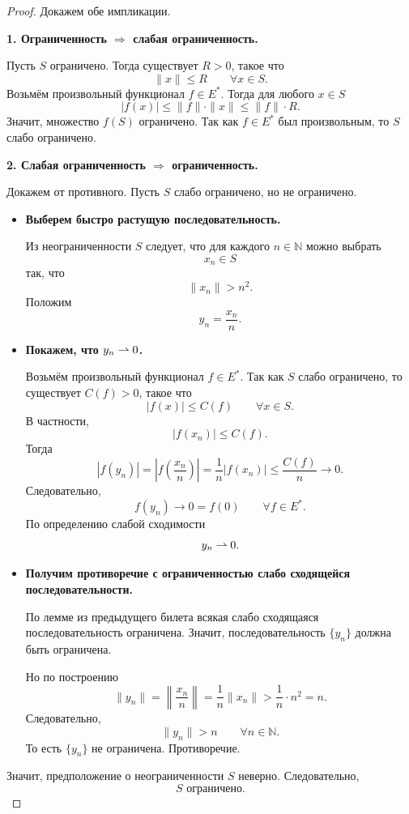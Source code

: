 \begin{proof}
	Докажем обе импликации.
	
	\textbf{1. Ограниченность \(\Rightarrow\) слабая ограниченность.}
	
	Пусть \(S\) ограничено. Тогда существует \(R>0\), такое что
	\[
	\|x\|\leqslant R
	\qquad
	\forall x\in S.
	\]
	Возьмём произвольный функционал \(f\in E^*\). Тогда для любого \(x\in S\)
	\[
	|f(x)|
	\leqslant
	\|f\|\cdot\|x\|
	\leqslant
	\|f\|\cdot R.
	\]
	Значит, множество \(f(S)\) ограничено. Так как \(f\in E^*\) был произвольным,
	то \(S\) слабо ограничено.
	
	\textbf{2. Слабая ограниченность \(\Rightarrow\) ограниченность.}
	
	Докажем от противного. Пусть \(S\) слабо ограничено, но не ограничено.
	
	\begin{itemize}
		\item \textbf{Выберем быстро растущую последовательность.}
		
		Из неограниченности \(S\) следует, что для каждого \(n\in\mathbb{N}\)
		можно выбрать
		\[
		x_n\in S
		\]
		так, что
		\[
		\|x_n\|>n^2.
		\]
		Положим
		\[
		y_n=\frac{x_n}{n}.
		\]
		
		\item \textbf{Покажем, что \(y_n\rightharpoonup 0\).}
		
		Возьмём произвольный функционал \(f\in E^*\). Так как \(S\) слабо ограничено,
		то существует \(C(f)>0\), такое что
		\[
		|f(x)|\leqslant C(f)
		\qquad
		\forall x\in S.
		\]
		В частности,
		\[
		|f(x_n)|\leqslant C(f).
		\]
		Тогда
		\[
		|f(y_n)|
		=
		\left|f\left(\frac{x_n}{n}\right)\right|
		=
		\frac{1}{n}|f(x_n)|
		\leqslant
		\frac{C(f)}{n}
		\to 0.
		\]
		Следовательно,
		\[
		f(y_n)\to 0=f(0)
		\qquad
		\forall f\in E^*.
		\]
		По определению слабой сходимости
		\[
		y_n\rightharpoonup 0.
		\]
		
		\item \textbf{Получим противоречие с ограниченностью слабо сходящейся последовательности.}
		
		По лемме из предыдущего билета всякая слабо сходящаяся последовательность ограничена.
		Значит, последовательность \(\{y_n\}\) должна быть ограничена.
		
		Но по построению
		\[
		\|y_n\|
		=
		\left\|\frac{x_n}{n}\right\|
		=
		\frac{1}{n}\|x_n\|
		>
		\frac{1}{n}\cdot n^2
		=
		n.
		\]
		Следовательно,
		\[
		\|y_n\|>n
		\qquad
		\forall n\in\mathbb{N}.
		\]
		То есть \(\{y_n\}\) не ограничена. Противоречие.
	\end{itemize}
	
	Значит, предположение о неограниченности \(S\) неверно. Следовательно,
	\[
	S \text{ ограничено}.
	\]
\end{proof}

